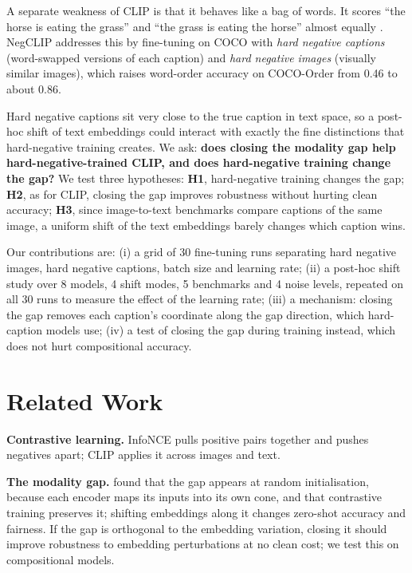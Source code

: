 \documentclass{article}
\begin{document}
A separate weakness of CLIP is that it behaves like a bag of words. It scores ``the horse is eating the grass'' and ``the grass is eating the horse'' almost equally \citep{yuksekgonul2023bow}. NegCLIP addresses this by fine-tuning on COCO with \emph{hard negative captions} (word-swapped versions of each caption) and \emph{hard negative images} (visually similar images), which raises word-order accuracy on COCO-Order from 0.46 to about 0.86.

Hard negative captions sit very close to the true caption in text space, so a post-hoc shift of text embeddings could interact with exactly the fine distinctions that hard-negative training creates. We ask: \textbf{does closing the modality gap help hard-negative-trained CLIP, and does hard-negative training change the gap?} We test three hypotheses:
\textbf{H1}, hard-negative training changes the gap;
\textbf{H2}, as for CLIP, closing the gap improves robustness without hurting clean accuracy;
\textbf{H3}, since image-to-text benchmarks compare captions of the same image, a uniform shift of the text embeddings barely changes which caption wins.

Our contributions are:
(i) a grid of 30 fine-tuning runs separating hard negative images, hard negative captions, batch size and learning rate;
(ii) a post-hoc shift study over 8 models, 4 shift modes, 5 benchmarks and 4 noise levels, repeated on all 30 runs to measure the effect of the learning rate;
(iii) a mechanism: closing the gap removes each caption's coordinate along the gap direction, which hard-caption models use;
(iv) a test of closing the gap during training instead, which does not hurt compositional accuracy.

\section{Related Work}
\label{sec:related}

\textbf{Contrastive learning.}
InfoNCE \citep{oord2018cpc} pulls positive pairs together and pushes negatives apart; CLIP \citep{radford2021clip} applies it across images and text.

\textbf{The modality gap.}
\citet{liang2022gap} found that the gap appears at random initialisation, because each encoder maps its inputs into its own cone, and that contrastive training preserves it; shifting embeddings along it changes zero-shot accuracy and fairness. If the gap is orthogonal to the embedding variation, closing it should improve robustness to embedding perturbations at no clean cost; we test this on compositional models.
\end{document}
